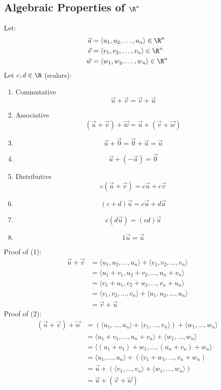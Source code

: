 \documentclass[letterpaper, 12pt]{math}
\begin{document}
\subsection*{Algebraic Properties of \( \R^n \)}
Let:
\begin{align*}
  \vec{u} &= \langle u_1,u_2,\dots,u_n\rangle\in\R^n \\
  \vec{v} &= \langle v_1,v_2,\dots,v_n\rangle\in\R^n \\
  \vec{w} &= \langle w_1,w_2,\dots,w_n\rangle\in\R^n
\end{align*}
Let \( c,d\in\R \) (scalars):
\begin{enumerate}
  \item Commutative
    \[ \vec{u}+\vec{v} = \vec{v}+\vec{u} \]
  \item Associative
    \[ (\vec{u}+\vec{v})+\vec{w} = \vec{u}+(\vec{v}+\vec{w}) \]
  \item
    \[ \vec{u}+\vec{0} = \vec{0}+\vec{u} = \vec{u} \]
  \item
    \[ \vec{u}+(-\vec{u}) = \vec{0} \]
  \item Distributive
    \[ c(\vec{u}+\vec{v}) = c\vec{u}+c\vec{v} \]
  \item
    \[ (c+d)\vec{u} = c\vec{u}+d\vec{u} \]
  \item
    \[ c(d\vec{u}) = (cd)\vec{u} \]
  \item
    \[ 1\vec{u} = \vec{u} \]
\end{enumerate}
Proof of (1):
\begin{align*}
  \vec{u}+\vec{v} &= \langle u_1,u_2,\dots,u_n\rangle+
    \langle v_1,v_2,\dots,v_n\rangle \\
  &= \langle u_1+v_1,u_2+v_2,\dots,u_n+v_n\rangle \\
  &= \langle v_1+u_1,v_2+u_2,\dots,v_n+u_n\rangle \\
  &= \langle v_1,v_2,\dots,v_n\rangle+
    \langle u_1,u_2,\dots,u_n\rangle \\
  &= \vec{v}+\vec{u}
\end{align*}
Proof of (2):
\begin{align*}
  (\vec{u}+\vec{v})+\vec{w} &= (\langle u_1,\dots,u_n\rangle+
    \langle v_1,\dots,v_n\rangle)+\langle w_1,\dots,w_n\rangle \\
  &= \langle u_1+v_1,\dots,u_n+v_n\rangle+
    \langle w_1,\dots,w_n\rangle \\
  &= \langle(u_1+v_1)+w_1,\dots,(u_n+v_n)+w_n\rangle \\
  &= \langle u_1,\dots,u_n\rangle +
    (\langle v_1+w_1,\dots,v_n+w_n) \\
  &= \vec{u}+(\langle v_1,\dots,v_n\rangle+
    \langle w_1,\dots,w_n\rangle) \\
  &= \vec{u}+(\vec{v}+\vec{w})
\end{align*}
\end{document}
